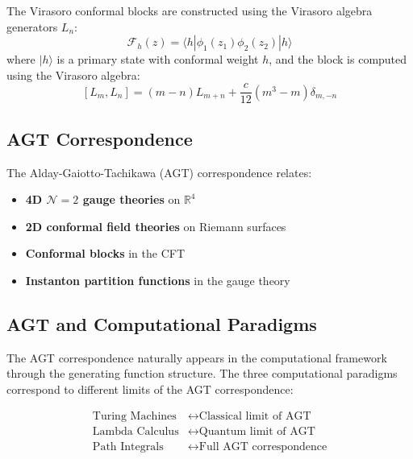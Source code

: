 \begin{definition}
\label{def:virasoro-blocks}
The Virasoro conformal blocks are constructed using the Virasoro algebra generators $L_n$:
\[
\mathcal{F}_h(z) = \langle h | \phi_1(z_1) \phi_2(z_2) | h \rangle
\]
where $|h\rangle$ is a primary state with conformal weight $h$, and the block is computed using the Virasoro algebra:
\[
[L_m, L_n] = (m-n)L_{m+n} + \frac{c}{12}(m^3-m)\delta_{m,-n}
\]
\end{definition}

\subsection{AGT Correspondence}

\begin{definition}
\label{def:agt-correspondence}
The Alday-Gaiotto-Tachikawa (AGT) correspondence relates:
\begin{itemize}
\item \textbf{4D $\mathcal{N}=2$ gauge theories} on $\mathbb{R}^4$
\item \textbf{2D conformal field theories} on Riemann surfaces
\item \textbf{Conformal blocks} in the CFT
\item \textbf{Instanton partition functions} in the gauge theory
\end{itemize}
\end{definition}

\subsection{AGT and Computational Paradigms}

\begin{theorem}
\label{thm:agt-computational}
The AGT correspondence naturally appears in the computational framework through the generating function structure. The three computational paradigms correspond to different limits of the AGT correspondence:

\begin{align}
\text{Turing Machines} &\leftrightarrow \text{Classical limit of AGT} \\
\text{Lambda Calculus} &\leftrightarrow \text{Quantum limit of AGT} \\
\text{Path Integrals} &\leftrightarrow \text{Full AGT correspondence}
\end{align}
\end{theorem}

